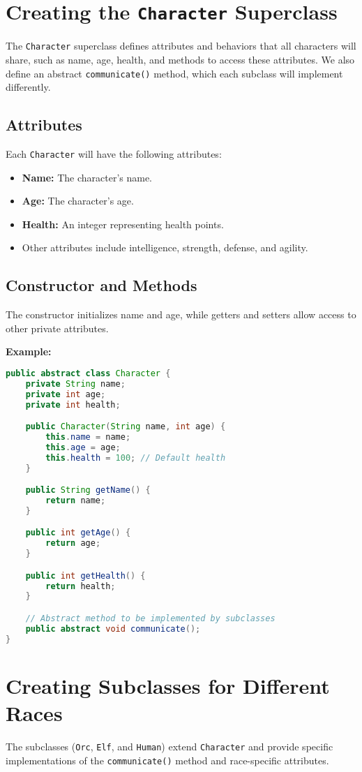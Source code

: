 \documentclass{article}
\begin{document}
\section{Creating the \texttt{Character} Superclass}
The \texttt{Character} superclass defines attributes and behaviors that all characters will share, such as name, age, health, and methods to access these attributes. We also define an abstract \texttt{communicate()} method, which each subclass will implement differently.

\subsection{Attributes}
Each \texttt{Character} will have the following attributes:
\begin{itemize}
    \item \textbf{Name:} The character’s name.
    \item \textbf{Age:} The character’s age.
    \item \textbf{Health:} An integer representing health points.
    \item Other attributes include intelligence, strength, defense, and agility.
\end{itemize}

\subsection{Constructor and Methods}
The constructor initializes name and age, while getters and setters allow access to other private attributes.

\textbf{Example:}
\begin{lstlisting}[language=Java]
public abstract class Character {
    private String name;
    private int age;
    private int health;

    public Character(String name, int age) {
        this.name = name;
        this.age = age;
        this.health = 100; // Default health
    }

    public String getName() {
        return name;
    }

    public int getAge() {
        return age;
    }

    public int getHealth() {
        return health;
    }

    // Abstract method to be implemented by subclasses
    public abstract void communicate();
}
\end{lstlisting}

\section{Creating Subclasses for Different Races}
The subclasses (\texttt{Orc}, \texttt{Elf}, and \texttt{Human}) extend \texttt{Character} and provide specific implementations of the \texttt{communicate()} method and race-specific attributes.
\end{document}
